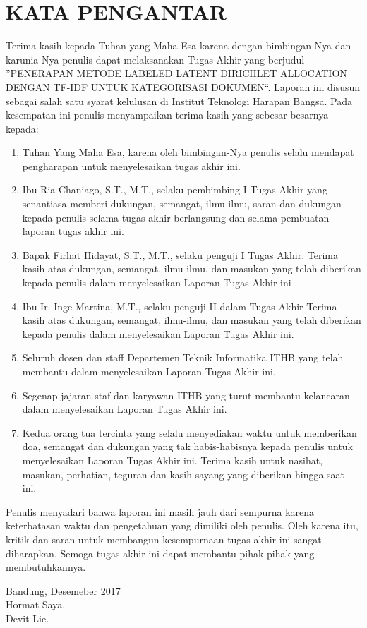 \chapter*{KATA PENGANTAR}
{\raggedleft Terima kasih kepada Tuhan yang Maha Esa karena dengan bimbingan-Nya dan karunia-Nya penulis dapat melaksanakan Tugas Akhir yang berjudul \textquotedblright PENERAPAN METODE LABELED LATENT DIRICHLET ALLOCATION DENGAN TF-IDF UNTUK KATEGORISASI DOKUMEN\textquotedblleft. Laporan ini disusun sebagai salah satu syarat kelulusan di Institut Teknologi Harapan Bangsa. Pada kesempatan ini penulis menyampaikan terima kasih yang sebesar-besarnya kepada:} \\
\begin{enumerate}
\item Tuhan Yang Maha Esa, karena oleh bimbingan-Nya penulis selalu mendapat pengharapan untuk menyelesaikan tugas akhir ini.
\item Ibu Ria Chaniago, S.T., M.T., selaku pembimbing I Tugas Akhir yang  senantiasa memberi dukungan, semangat, ilmu-ilmu, saran dan dukungan kepada penulis selama tugas akhir berlangsung dan selama pembuatan laporan tugas akhir ini.
\item Bapak Firhat Hidayat, S.T., M.T., selaku penguji I Tugas Akhir. Terima kasih atas dukungan, semangat, ilmu-ilmu, dan masukan yang telah diberikan kepada penulis dalam menyelesaikan Laporan Tugas Akhir ini
\item Ibu Ir. Inge Martina, M.T., selaku penguji II dalam Tugas Akhir Terima kasih atas dukungan, semangat, ilmu-ilmu, dan masukan yang telah diberikan kepada penulis dalam menyelesaikan Laporan Tugas Akhir ini.
\item Seluruh dosen dan staff Departemen Teknik Informatika ITHB yang telah membantu dalam menyelesaikan Laporan Tugas Akhir ini.
\item Segenap jajaran staf dan karyawan ITHB yang turut membantu kelancaran dalam menyelesaikan Laporan Tugas Akhir ini.
\item Kedua orang tua tercinta yang selalu menyediakan waktu untuk memberikan doa, semangat dan dukungan yang tak habis-habisnya kepada penulis untuk menyelesaikan Laporan Tugas Akhir ini. Terima kasih untuk nasihat, masukan, perhatian, teguran dan kasih sayang yang diberikan hingga saat ini.
\\
\end{enumerate}
Penulis menyadari bahwa laporan ini masih jauh dari sempurna karena keterbatasan waktu dan pengetahuan yang dimiliki oleh penulis. Oleh karena itu, kritik dan saran untuk membangun kesempurnaan tugas akhir ini sangat diharapkan. Semoga tugas akhir ini dapat membantu pihak-pihak yang membutuhkannya.\\[1.5cm]  
\hfill
{\begin{flushright} Bandung, Desemeber 2017\\[1.5cm] Hormat  Saya,\\ Devit Lie.\end{flushright}}
\newpage